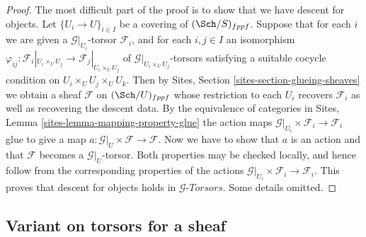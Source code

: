 \begin{proof}
The most difficult part of the proof is to show that
we have descent for objects.
Let $\{U_i \to U\}_{i \in I}$ be a covering of $(\Sch/S)_{fppf}$.
Suppose that for each $i$ we are given a $\mathcal{G}|_{U_i}$-torsor
$\mathcal{F}_i$, and for each $i, j \in I$ an isomorphism
$\varphi_{ij} :
\mathcal{F}_i|_{U_i \times_U U_j} \to \mathcal{F}_j|_{U_i \times_U U_j}$
of $\mathcal{G}|_{U_i \times_U U_j}$-torsors
satisfying a suitable cocycle condition on $U_i \times_U U_j \times_U U_k$.
Then by
Sites, Section \ref{sites-section-glueing-sheaves}
we obtain a sheaf $\mathcal{F}$ on $(\Sch/U)_{fppf}$
whose restriction to each $U_i$ recovers $\mathcal{F}_i$ as well
as recovering the descent data. By the equivalence of categories in
Sites, Lemma \ref{sites-lemma-mapping-property-glue}
the action maps $\mathcal{G}|_{U_i} \times \mathcal{F}_i \to \mathcal{F}_i$
glue to give a map $a : \mathcal{G}|_U \times \mathcal{F} \to \mathcal{F}$.
Now we have to show that $a$ is an action and that $\mathcal{F}$ becomes
a $\mathcal{G}|_U$-torsor. Both properties may be checked locally, and
hence follow from the corresponding properties of the actions
$\mathcal{G}|_{U_i} \times \mathcal{F}_i \to \mathcal{F}_i$.
This proves that descent for objects holds in
$\mathcal{G}\textit{-Torsors}$.
Some details omitted.
\end{proof}


\subsection{Variant on torsors for a sheaf}
\label{examples-stacks-subsection-variant-torsor-sheaf}


